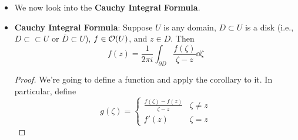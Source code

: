 \documentclass[../notes.tex]{subfiles}
\begin{document}
\begin{itemize}
\begin{proof}
\begin{figure}[H]
            \caption{Bounded holomorphic functions integrate to zero on disk boundaries.}
            \label{fig:holDiskBound}
        \end{figure}
        Via the above claim,
        \begin{equation*}
            \int_{\partial D}f\dd{z} = \int_{\gamma_\varepsilon}f\dd{z}
        \end{equation*}
        where $\gamma_\varepsilon$ is a circle around $z$ within the region where $f$ is bounded\footnote{We could also turn the plane into the sum of two star-shaped domains again.}.\par
        Step 2: We have that
        \begin{equation*}
            \left| \int_{\gamma_\varepsilon}f\dd{z} \right| \leq \max_{z\in\gamma_\varepsilon}|f(z)|\cdot\len(\gamma_\varepsilon)
        \end{equation*}
        Since $f$ is bounded near $z$, the maximum is finite. Additionally, the length term is just $2\pi\varepsilon$, so we can send $\varepsilon\to 0$ and thus send the integral to zero.
    \end{proof}
    \item We now look into the \textbf{Cauchy Integral Formula}.
    \item \textbf{Cauchy Integral Formula}: Suppose $U$ is any domain, $D\subset U$ is a disk (i.e., $D\subset\subset U$ or $\overline{D}\subset U$), $f\in\mathcal{O}(U)$, and $z\in D$. Then
    \begin{equation*}
        f(z) = \frac{1}{2\pi i}\int_{\partial D}\frac{f(\zeta)}{\zeta-z}\dd\zeta
    \end{equation*}
    \begin{proof}
        We're going to define a function and apply the corollary to it. In particular, define
        \begin{equation*}
            g(\zeta) =
            \begin{cases}
                \frac{f(\zeta)-f(z)}{\zeta-z} & \zeta\neq z\\
                f'(z) & \zeta=z
            \end{cases}
        \end{equation*}

\end{proof}
\end{itemize}
\end{document}
